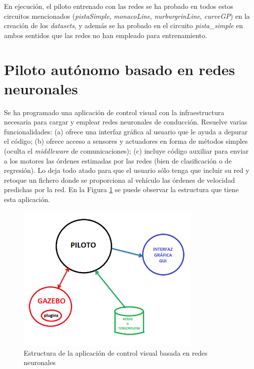 En ejecución, el piloto entrenado con las redes se ha probado en todos estos circuitos mencionados (\textit{pistaSimple}, \textit{monacoLine}, \textit{nurburgrinLine}, \textit{curveGP}) en la creación de los \textit{datasets}, y además se ha probado en el circuito \textit{pista\_simple} en ambos sentidos que las redes no han empleado para entrenamiento.


\section{Piloto autónomo basado en redes neuronales}

Se ha programado una aplicación de control visual con la infraestructura necesaria para cargar y emplear redes neuronales de conducción. Resuelve varias funcionalidades: (a) ofrece una interfaz gráfica al usuario que le ayuda a depurar el código; (b) ofrece acceso a sensores y actuadores en forma de métodos simples (oculta el \textit{middleware} de comunicaciones); (c) incluye código auxiliar para enviar a los motores las órdenes estimadas por las redes (bien de clasificación o de regresión). Lo deja todo atado para que el usuario sólo tenga que incluir su red y retoque un fichero donde se proporciona al vehículo las órdenes de velocidad predichas por la red. En la Figura \ref{fig.nodo_piloto} se puede observar la estructura que tiene esta aplicación.\\

\begin{figure}
  \begin{center}
    \includegraphics[width=0.8\textwidth]{figures/Infraestructura/nodo_piloto.png}
		\caption{Estructura de la aplicación de control visual basada en redes neuronales}
		\label{fig.nodo_piloto}
		\end{center}
\end{figure}

